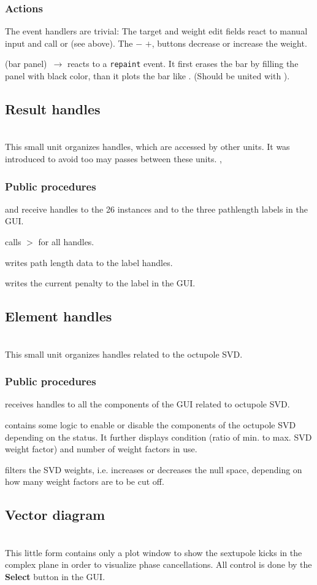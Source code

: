 \documentclass[12pt]{article}
\newcommand\code[1]{{\tt #1}}
\newcommand{\ofld}[1]{\colorbox{black!15}{{\bf #1}}}
\newcommand{\ofldx}[1]{\colorbox{black!15}{(#1)}}
\newcommand\guifco[1]{{\color{violet}\code{#1}}}
\newcommand{\unico}[1]{{\color{burntorange}\code{#1}}}
\newcommand{\evcodxf}[2]{\ofldx{#1}~$\rightarrow$ \guifco{#2}}
\newcommand{\gfcod}[2]{\opaguif{#1}$>$\guifco{#2}}
\newcommand{\opagui}[1]{\colorbox{blue!20}{{\color{black}\code{#1}}}}
\newcommand{\oguih}[2]{\subsection{\label{#2}#1}{\Huge\opagui{#2}}\\}
\newcommand{\ogui}[1]{\hyperref[#1]{\opagui{#1}}}
\newcommand{\opaguif}[1]{\colorbox{violet!30}{{\color{black}\code{#1}}}}
\newcommand{\oguif}[1]{\hyperref[#1]{\opaguif{#1}}}
\newcommand{\opauni}[1]{\colorbox{orange!30}{{\color{black}\code{#1}}}}
\newcommand{\ounih}[2]{\subsection{\label{#2}#1}{\Huge\opauni{#2}}\\}
\newcommand{\ouni}[1]{\hyperref[#1]{\opauni{#1}}}
\newcommand{\uses}[1]{\flushleft {\bf Uses:} #1}
\newcommand{\desc}[1]{#1}
\newcommand{\act}[1]{\subsubsection*{Actions} #1}
\newcommand{\ppro}[1]{\subsubsection*{Public procedures} #1}
\newcommand{\todo}[1]{{\color{red} #1}}
\begin{document}
\act{
The event handlers are trivial: The target and weight edit fields react to manual input and call \guifco{UpdateTarget} or \guifco{UpdateWeight} (see above). The \ofld{$-$} \ofld{$+$}, buttons decrease or increase the weight.

\evcodxf{bar panel}{PanBarPaint} reacts to a \code{repaint} event. It first erases the bar by filling the panel with black color, than it plots the bar like \guifco{PlotBar}. \todo{(Should be united with \guifco{PlotBar})}.

}


\ounih{Result handles}{chromreslib} 

\desc{This small unit organizes handles, which are accessed by other units. It was introduced to avoid too may passes between these units.}
\uses{
\oguif{chamframe}, \ouni{chromlib}
}
\ppro{
\unico{Pass\_CH\_Handles} and \unico{Pass\_LabPath\_Handles} receive handles to the 26 \guifco{chamframe} instances and to the three pathlength labels in the \ogui{opachroma} GUI.

\unico{UpdateHamilton} calls \gfcod{chamframe}{UpdateHam} for all handles.

\unico{UpdatePath} writes path length data to the label handles.

\unico{UpdatePenalty} writes the current penalty to the label in the \ogui{opachroma} GUI.
}

\ounih{Element handles}{chromelelib} 

\desc{This small unit organizes handles related to the octupole SVD.
}
\uses{ \ouni{chromlib} }
\ppro{
\unico{Pass\_Osvd\_Handles} receives handles to all the components of the \ogui{opachroma} GUI related to octupole SVD.

\unico{Osvd\_Status} contains some logic to enable or disable the components of the octupole SVD depending on the status. It further displays condition (ratio of min. to max. SVD weight factor) and number of weight factors in use.

\unico{Osvd\_Wfilter} filters the SVD weights, i.e. increases or decreases the null space, depending on how many weight factors are to be cut off.

}


\oguih{Vector diagram}{ochromsvector} 

\desc{This little form contains only a plot window to show the sextupole kicks in the complex plane in order to visualize phase cancellations. All control is done by the \ofld{Select} button in the \ogui{opachroma} GUI.}
\end{document}
